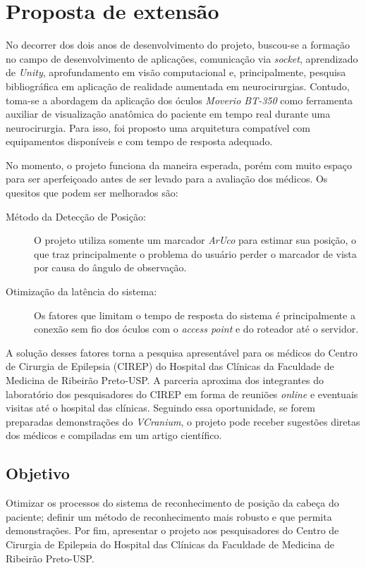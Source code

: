 \chapter{Proposta de extensão}\label{chp:extensao}

No decorrer dos dois anos de desenvolvimento do projeto, buscou-se a formação no campo de desenvolvimento de aplicações, comunicação via \textit{socket}, aprendizado de \textit{Unity}, aprofundamento em visão computacional e, principalmente, pesquisa bibliográfica em aplicação de realidade aumentada em neurocirurgias. Contudo, toma-se a abordagem da aplicação dos óculos \textit{Moverio BT-350} como ferramenta auxiliar de visualização anatômica do paciente em tempo real durante uma neurocirurgia. Para isso, foi proposto uma arquitetura compatível com equipamentos disponíveis e com tempo de resposta adequado.

No momento, o projeto funciona da maneira esperada, porém com muito espaço para ser aperfeiçoado antes de ser levado para a avaliação dos médicos. Os quesitos que podem ser melhorados são:

\begin{description}
   \item[Método da Detecção de Posição:] O projeto utiliza somente um marcador \textit{ArUco} para estimar sua posição, o que traz principalmente o problema do usuário perder o marcador de vista por causa do ângulo de observação.
   \item[Otimização da latência do sistema:] Os fatores que limitam o tempo de resposta do sistema é principalmente a conexão sem fio dos óculos com o \textit{access point} e do roteador até o servidor.
\end{description}

A solução desses fatores torna a pesquisa apresentável para os médicos do Centro de Cirurgia de Epilepsia (CIREP) do Hospital das Clínicas da Faculdade de Medicina de Ribeirão Preto-USP. A parceria aproxima dos integrantes do laboratório dos pesquisadores do CIREP em forma de reuniões \textit{online} e eventuais visitas até o hospital das clínicas. Seguindo essa oportunidade, se forem preparadas demonstrações do \textit{VCranium}, o projeto pode receber sugestões diretas dos médicos e compiladas em um artigo científico. 

\section{Objetivo}

Otimizar os processos do sistema de reconhecimento de posição da cabeça do paciente; definir um método de reconhecimento mais robusto e que permita demonstrações. Por fim, apresentar o projeto aos pesquisadores do Centro de Cirurgia de Epilepsia do Hospital das Clínicas da Faculdade de Medicina de Ribeirão Preto-USP.


